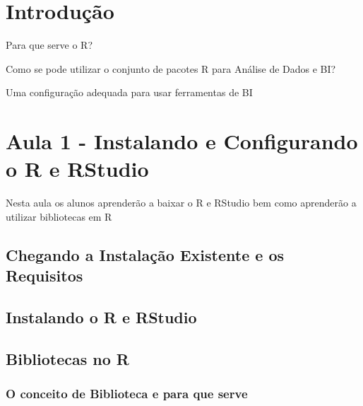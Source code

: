 \documentclass[12pt,a4paper,oneside]{erdc}
\begin{document}







\maketitle

\tableofcontents




\mainmatter


\chapter{Introdução }

Para que serve o R?

Como se pode utilizar o conjunto de pacotes R para Análise de Dados e BI?

Uma configuração adequada para usar ferramentas de BI 

		

\chapter{Aula 1 - Instalando e Configurando o R e RStudio}

Nesta aula os alunos aprenderão a baixar o R e RStudio bem como aprenderão a utilizar bibliotecas em R

\section{Chegando a Instalação Existente e os Requisitos}

\section{Instalando o R e RStudio}

\section{Bibliotecas no R}

\subsection{O conceito de Biblioteca e para que serve}
\end{document}
